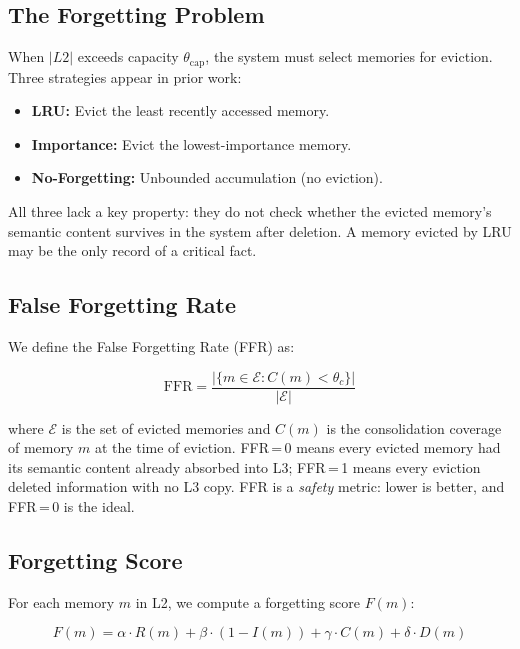 \documentclass{article}
\begin{document}
\subsection{The Forgetting Problem}

When $|L2|$ exceeds capacity $\theta_{\text{cap}}$, the system must select
memories for eviction.  Three strategies appear in prior work:

\begin{itemize}
  \item \textbf{LRU:} Evict the least recently accessed memory.
  \item \textbf{Importance:} Evict the lowest-importance memory.
  \item \textbf{No-Forgetting:} Unbounded accumulation (no eviction).
\end{itemize}

All three lack a key property: they do not check whether the evicted memory's
semantic content survives in the system after deletion.  A memory evicted by
LRU may be the only record of a critical fact.

\subsection{False Forgetting Rate}

We define the False Forgetting Rate (FFR) as:

\begin{equation}
\text{FFR} = \frac{|\{m \in \mathcal{E} : C(m) < \theta_c\}|}{|\mathcal{E}|}
\label{eq:ffr}
\end{equation}

where $\mathcal{E}$ is the set of evicted memories and $C(m)$ is the
consolidation coverage of memory $m$ at the time of eviction.
FFR\,=\,0 means every evicted memory had its semantic content already absorbed
into L3; FFR\,=\,1 means every eviction deleted information with no L3 copy.
FFR is a \emph{safety} metric: lower is better, and FFR\,=\,0 is the ideal.

\subsection{Forgetting Score}

For each memory $m$ in L2, we compute a forgetting score $F(m)$:

\begin{equation}
F(m) = \alpha \cdot R(m) + \beta \cdot (1 - I(m)) + \gamma \cdot C(m) + \delta \cdot D(m)
\label{eq:forget_score}
\end{equation}
\end{document}
